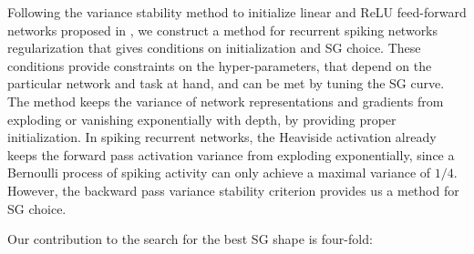 
Following the variance stability method to initialize linear and ReLU feed-forward networks proposed in \cite{glorot2010understanding, he2015delving}, we construct a method for recurrent spiking networks regularization that gives conditions on initialization and SG choice. These conditions provide constraints on the hyper-parameters, that depend on the particular network and task at hand, and can be met by tuning the SG curve. The method keeps the variance of network representations and gradients from exploding or vanishing exponentially with depth, by providing proper initialization.
In spiking recurrent networks, the Heaviside activation already keeps the forward pass activation variance from exploding exponentially, since a Bernoulli process of spiking activity can only achieve a maximal variance of $1/4$. However, the backward pass variance stability criterion provides us a method for SG choice.

Our contribution to the search for the best SG shape is four-fold:



